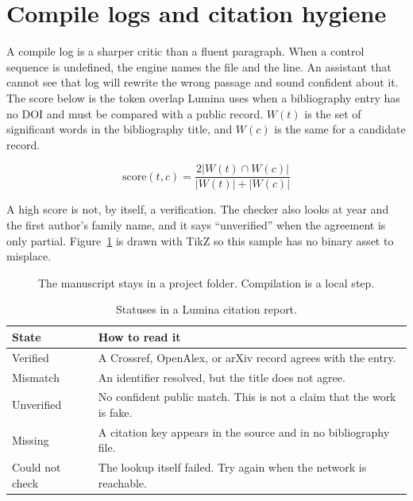 \section{Compile logs and citation hygiene}
\label{sec:practice}

A compile log is a sharper critic than a fluent paragraph.
When a control sequence is undefined, the engine names the file and the line.
An assistant that cannot see that log will rewrite the wrong passage and sound confident about it.
The score below is the token overlap Lumina uses when a bibliography entry has no DOI and must be compared with a public record.
$W(t)$ is the set of significant words in the bibliography title, and $W(c)$ is the same for a candidate record.

\begin{equation}
  \mathrm{score}(t, c) = \frac{2 \lvert W(t) \cap W(c) \rvert}{\lvert W(t) \rvert + \lvert W(c) \rvert}
  \label{eq:dice}
\end{equation}

A high score is not, by itself, a verification.
The checker also looks at year and the first author's family name, and it says ``unverified'' when the agreement is only partial.
Figure~\ref{fig:desk} is drawn with TikZ so this sample has no binary asset to misplace.

\begin{figure}[ht]
  \centering
  \caption{The manuscript stays in a project folder. Compilation is a local step.}
  \label{fig:desk}
\end{figure}

\begin{table}[ht]
  \centering
  \begin{tabular}{lp{7.2cm}}
    \toprule
    State & How to read it \\
    \midrule
    Verified & A Crossref, OpenAlex, or arXiv record agrees with the entry. \\
    Mismatch & An identifier resolved, but the title does not agree. \\
    Unverified & No confident public match. This is not a claim that the work is fake. \\
    Missing & A citation key appears in the source and in no bibliography file. \\
    Could not check & The lookup itself failed. Try again when the network is reachable. \\
    \bottomrule
  \end{tabular}
  \caption{Statuses in a Lumina citation report.}
  \label{tab:status}
\end{table}

